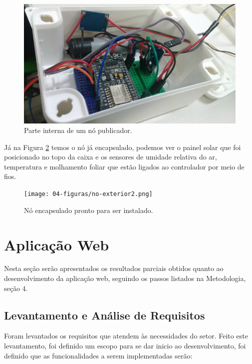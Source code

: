 \begin{figure}[H]
    \centering
    \includegraphics[scale=0.1]{04-figuras/no-interior.jpg}
    \caption{Parte interna de um nó publicador.}
    \vspace{-\baselineskip}
    \label{fig:no-interno}
\end{figure}

Já na Figura \ref{fig:no-externo2} temos o nó já encapsulado, podemos ver o painel solar que foi posicionado no topo da caixa e os sensores de umidade relativa do ar, temperatura e molhamento foliar que estão ligados ao controlador por meio de fios.

\begin{figure}[H]
    \centering
    \texttt{[image: 04-figuras/no-exterior2.png]}
    \caption{Nó encapsulado pronto para ser instalado.}
    \vspace{-\baselineskip}
    \label{fig:no-externo2}
\end{figure}

\section{Aplicação Web}
Nesta seção serão apresentados os resultados parciais obtidos quanto ao desenvolvimento da aplicação web, seguindo os passos listados na Metodologia, seção 4.

\subsection{Levantamento e Análise de Requisitos}
Foram levantados os requisitos que atendem às necessidades do setor. Feito este levantamento, foi definido um escopo para se dar inicio ao desenvolvimento, foi definido que as funcionalidades a serem implementadas serão: 

